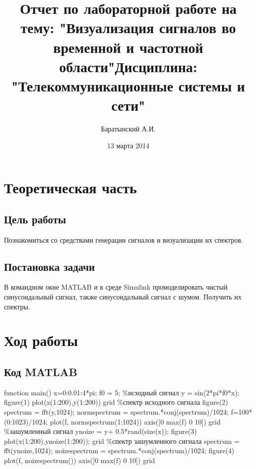 \documentclass[10pt,a4paper]{report}
\author{Баратынский А.И.}
\title{Отчет по лабораторной работе на тему: "Визуализация сигналов во временной и частотной области"\newline Дисциплина: "Телекоммуникационные системы и сети"}
\date{13 марта 2014}
\begin{document}
\maketitle
\pagebreak
\chapter{Теоретическая часть}
\section{Цель работы}
Познакомиться со средствами генерации сигналов и визуализации их спектров.
\section{Постановка задачи}
В командном окне MATLAB и в среде Simulink промоделировать чистый синусоидальный сигнал,
также синусоидальный сигнал с шумом. Получить их спектры.
\chapter{Ход работы}
\section{Код MATLAB}
function main()\newline
x=0:0.01:4*pi;\newline
f0 = 5;\newline
\%исходный сигнал\newline
y = sin(2*pi*f0*x);\newline
figure(1)\newline
plot(x(1:200),y(1:200))\newline
grid\newline
\%спектр исходного сигнала\newline
figure(2)\newline
spectrum = fft(y,1024);\newline
normspectrum = spectrum.*conj(spectrum)/1024;\newline
f=100*(0:1023)/1024;\newline
plot(f, normspectrum(1:1024))\newline
axis([0 max(f) 0 10])\newline
grid\newline
\%зашумленный сигнал\newline
ynoize = y+ 0.5*rand(size(x));\newline
figure(3)\newline
plot(x(1:200),ynoize(1:200));\newline
grid\newline
\%спектр зашумленного сигнала\newline
spectrum = fft(ynoize,1024);\newline
noizespectrum = spectrum.*conj(spectrum)/1024;\newline
figure(4)\newline
plot(f, noizespectrum())\newline
axis([0 max(f) 0 10])\newline
grid\newline
\end{document}
